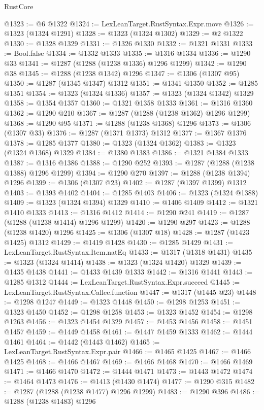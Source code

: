 \begin{lexlean}{RustCore}
\begin{coremodule}
@1323 := @6 @1322
@1324 := LexLeanTarget.RustSyntax.Expr.move
@1326 := @1323 (@1324 @1291)
@1328 := @1323 (@1324 @1302)
@1329 := @2 @1322
@1330 := @1328 @1329
@1331 := @1326 @1330
@1332 := @1321 @1331
@1333 := Bool.false
@1334 := @1332 @1333
@1335 := @1316 @1334
@1336 := @1290 @33
@1341 := @1287 (@1288 (@1238 @1336) @1296 @1299)
@1342 := @1290 @38
@1345 := @1288 (@1238 @1342) @1296
@1347 := @1306 (@1307 @95)
@1350 := @1287 (@1345 @1347) @1312
@1351 := @1341 @1350
@1352 := @1285 @1351
@1354 := @1323 (@1324 @1336)
@1357 := @1323 (@1324 @1342) @1329
@1358 := @1354 @1357
@1360 := @1321 @1358 @1333
@1361 := @1316 @1360
@1362 := @1290 @210
@1367 := @1287 (@1288 (@1238 @1362) @1296 @1299)
@1368 := @1290 @95
@1371 := @1288 (@1238 @1368) @1296
@1373 := @1306 (@1307 @33)
@1376 := @1287 (@1371 @1373) @1312
@1377 := @1367 @1376
@1378 := @1285 @1377
@1380 := @1323 (@1324 @1362)
@1383 := @1323 (@1324 @1368) @1329
@1384 := @1380 @1383
@1386 := @1321 @1384 @1333
@1387 := @1316 @1386
@1388 := @1290 @252
@1393 := @1287 (@1288 (@1238 @1388) @1296 @1299)
@1394 := @1290 @270
@1397 := @1288 (@1238 @1394) @1296
@1399 := @1306 (@1307 @23)
@1402 := @1287 (@1397 @1399) @1312
@1403 := @1393 @1402
@1404 := @1285 @1403
@1406 := @1323 (@1324 @1388)
@1409 := @1323 (@1324 @1394) @1329
@1410 := @1406 @1409
@1412 := @1321 @1410 @1333
@1413 := @1316 @1412
@1414 := @1290 @241
@1419 := @1287 (@1288 (@1238 @1414) @1296 @1299)
@1420 := @1290 @297
@1423 := @1288 (@1238 @1420) @1296
@1425 := @1306 (@1307 @18)
@1428 := @1287 (@1423 @1425) @1312
@1429 := @1419 @1428
@1430 := @1285 @1429
@1431 := LexLeanTarget.RustSyntax.Item.natEq
@1433 := @1317 (@1318 @1431)
@1435 := @1323 (@1324 @1414)
@1438 := @1323 (@1324 @1420) @1329
@1439 := @1435 @1438
@1441 := @1433 @1439 @1333
@1442 := @1316 @1441
@1443 := @1285 @1312
@1444 := LexLeanTarget.RustSyntax.Expr.succeed
@1445 := LexLeanTarget.RustSyntax.Callee.function
@1447 := @1317 (@1445 @23)
@1448 := @1298 @1247
@1449 := @1323 @1448
@1450 := @1298 @1253
@1451 := @1323 @1450
@1452 := @1298 @1258
@1453 := @1323 @1452
@1454 := @1298 @1263
@1456 := @1323 @1454 @1329
@1457 := @1453 @1456
@1458 := @1451 @1457
@1459 := @1449 @1458
@1461 := @1447 @1459 @1333
@1462 := @1444 @1461
@1464 := @1442 (@1443 @1462)
@1465 := LexLeanTarget.RustSyntax.Expr.pair
@1466 := @1465 @1425
@1467 := @1466 @1425
@1468 := @1466 @1467
@1469 := @1466 @1468
@1470 := @1466 @1469
@1471 := @1466 @1470
@1472 := @1444 @1471
@1473 := @1443 @1472
@1474 := @1464 @1473
@1476 := @1413 (@1430 @1474)
@1477 := @1290 @315
@1482 := @1287 (@1288 (@1238 @1477) @1296 @1299)
@1483 := @1290 @396
@1486 := @1288 (@1238 @1483) @1296

\end{coremodule}
\end{lexlean}

